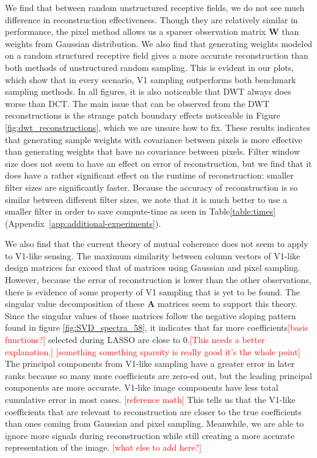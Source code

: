 \documentclass{article}
\newcommand{\todo}[1]{\textcolor{red}{[#1]}}
\newcommand{\mat}{\mathbf}
\begin{document}
We find that between random unstructured receptive fields, we do not see much difference in reconstruction effectiveness.
Though they are relatively similar in performance, the pixel method allows us a sparser observation matrix $\mat W$ than weights from Gaussian distribution.
We also find that generating weights modeled on a random structured receptive field gives a more accurate reconstruction than both methods of unstructured random sampling.
This is evident in our plots, which show that in every scenario, V1 sampling outperforms both benchmark sampling methods.
In all figures, it is also noticeable that DWT always does worse than DCT.
The main issue that can be observed from the DWT reconstructions is the strange patch boundary effects noticeable in Figure {\ref{fig:dwt_reconstructions}}, which we are unsure how to fix.
These results indicates that generating sample weights with covariance between pixels is more effective than generating weights that have no covariance between pixels.
Filter window size does not seem to have an effect on error of reconstruction, but we find that it does have a rather significant effect on the runtime of reconstruction: smaller filter sizes are significantly faster.
Because the accuracy of reconstruction is so similar between different filter sizes, we note that it is much better to use a smaller filter in order to save compute-time as seen in Table{\ref{table:times}} (Appendix~\ref{app:additional-experiments}).

We also find that the current theory of mutual coherence does not seem to apply to V1-like sensing.
The maximum similarity between column vectors of V1-like design matrices far exceed that of matrices using Gaussian and pixel sampling.
However, because the error of reconstruction is lower than the other observations, there is evidence of some property of V1 sampling that is yet to be found. 
The singular value decomposition of these $\mat{A}$ matrices seem to support this theory.
Since the singular values of those matrices follow the negative sloping pattern found in figure \hyperref[fig:SVD]{\ref{fig:SVD_spectra_58}}, it indicates that far more coefficients\todo{basis functions?} selected during LASSO are close to 0.\todo{This needs a better explanation.}
\todo{something something sparsity is really good it's the whole point}
The principal components from V1-like sampling have a greater error in later ranks because so many more coefficients are zero-ed out, but the leading principal components are more accurate.
V1-like image components have less total cumulative error in most cases.
\todo{reference math}
This tells us that the V1-like coefficients that are relevant to reconstruction are closer to the true coefficients than ones coming from Gaussian and pixel sampling.
Meanwhile, we are able to ignore more signals during reconstruction while still creating a more accurate representation of the image.
\todo{what else to add here?}
\end{document}
